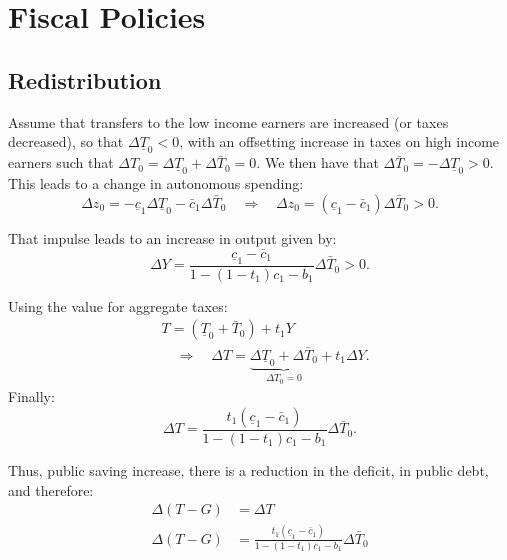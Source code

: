 \documentclass[]{book}
\theoremstyle{definition}
\theoremstyle{definition}
\theoremstyle{definition}
\theoremstyle{remark}
\begin{document}
\section{Fiscal Policies}\label{redistributive-fiscal}

\subsection{Redistribution}\label{redistribution-rich-to-poor}

Assume that transfers to the low income earners are increased (or taxes
decreased), so that \(\Delta\underline{T}_{0}<0\), with an offsetting
increase in taxes on high income earners such that
\(\Delta T_0 = \Delta\underline{T}_{0}+\Delta\bar{T}_{0}=0\). We then
have that \(\Delta\bar{T}_{0}=-\Delta\underline{T}_{0}>0\). This leads
to a change in autonomous spending:
\[\Delta z_{0}=-\underline{c}_{1}\Delta\underline{T}_{0}-\bar{c}_{1}\Delta\bar{T}_{0}\quad\Rightarrow\quad\Delta z_{0}=\left(\underline{c}_{1}-\bar{c}_{1}\right)\Delta\bar{T}_{0}>0.\]

That impulse leads to an increase in output given by:
\[\Delta Y=\frac{\underline{c}_{1}-\bar{c}_{1}}{1-\left(1-t_{1}\right)c_{1}-b_{1}}\Delta\bar{T}_{0}>0.\]

Using the value for aggregate taxes: \[
\begin{aligned}
&T=\left(\underline{T}_{0}+\bar{T}_{0}\right)+t_1 Y\\
&\quad \Rightarrow \quad \Delta T=\underbrace{\Delta\underline{T}_{0}+\Delta\bar{T}_{0}}_{\Delta T_0 = 0}+t_1\Delta Y.
\end{aligned}
\] Finally:
\[\Delta T=\frac{t_1\left(\underline{c}_{1}-\bar{c}_{1}\right)}{1-\left(1-t_{1}\right)c_{1}-b_{1}}\Delta\bar{T}_{0}.\]

Thus, public saving increase, there is a reduction in the deficit, in
public debt, and therefore: \[
\begin{aligned}
\Delta\left(T-G\right)&=\Delta T \\
\Delta\left(T-G\right)&=\frac{t_1\left(\underline{c}_{1}-\bar{c}_{1}\right)}{1-\left(1-t_{1}\right)c_{1}-b_{1}}\Delta\bar{T}_{0}
\end{aligned}
\]
\end{document}
